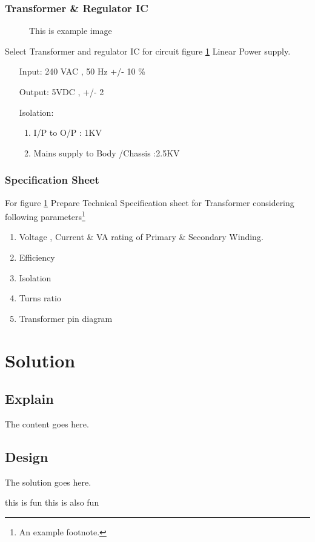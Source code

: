 \documentclass[11pt]{article}
\begin{document}
			\subsubsection{Transformer \& Regulator IC}
				\begin{figure}[H]
					\caption{This is example image}
					\label{fig:image1}
				\end{figure}
				Select Transformer and regulator IC for circuit figure \ref{fig:image1} 					Linear Power supply.
				\begin{enumerate}[align=left]
					\item[Input:] 240 VAC , 50 Hz +/- 10 \%
					\item[Output:] 5VDC , +/- 2%
					\item [Isolation:]
					
						\begin{enumerate}[align =left]
						
							\item I/P to O/P : 1KV
							\item Mains supply to Body /Chassis :2.5KV
						\end{enumerate}
				\end{enumerate}
			\subsubsection{Specification Sheet}
				For figure \ref{fig:image1} Prepare Technical Specification sheet for 						Transformer considering following parameters\footnote{An example 							footnote.}	
				\begin{enumerate}
					\item Voltage , Current \& VA rating of Primary \& Secondary 									Winding.
					\item Efficiency
					\item Isolation
					\item Turns ratio
					\item Transformer pin diagram				
				\end{enumerate}
				
		\section{Solution}
			\subsection{Explain}
				The content goes here\cite{ref1}.
			\subsection{Design}
				The solution goes here.		
		
		\newpage
		\begin{thebibliography}{}
			this is fun
			this is also fun
		\end{thebibliography}
\end{document}
